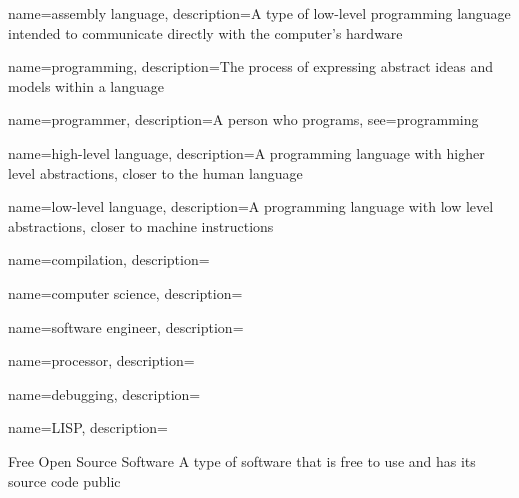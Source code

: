 \makeglossaries


 {
  name=assembly language,
  description={A type of low-level programming language intended to communicate directly with the computer's hardware}
}

 {
  name=programming,
  description={The process of expressing abstract ideas and models within a language}
}

 {
  name=programmer,
  description={A person who programs},
  see={programming}
}

 {
  name=high-level language,
  description={A programming language with higher level abstractions, closer to the human language}
}

 {
  name=low-level language,
  description={A programming language with low level abstractions, closer to machine instructions}
}

 {
  name=compilation,
  description={}
}

 {
  name=computer science,
  description={}
}

 {
  name=software engineer,
  description={}
}

 {
  name=processor,
  description={}
}

 {
  name=debugging,
  description={}
}

 {
  name=LISP,
  description={}
}


  {Free Open Source Software}
  {A type of software that is free to use and has its source code public}




